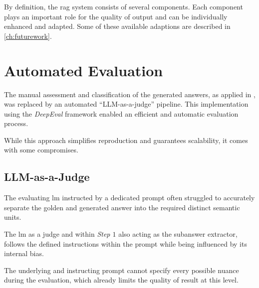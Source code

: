 By definition, the \ac{rag} system consists of several components.
Each component plays an important role for the quality of output and can be individually enhanced and adapted.
Some of these available adaptions are described in \cref{ch:futurework}.
%
\section{Automated Evaluation}

The manual assessment and classification of the generated answers, as applied in \citet{Paul_Keller}, was replaced by an automated \enquote{LLM-as-a-judge} pipeline.
This implementation using the \textit{DeepEval} framework enabled an efficient and automatic evaluation process.

While this approach simplifies reproduction and guarantees scalability, it comes with some compromises.
%
\subsection{LLM-as-a-Judge}

The evaluating \ac{lm} instructed by a dedicated prompt often struggled to accurately separate the golden and generated answer into the required distinct semantic units.

The \ac{lm} as a judge and within \textit{Step $1$} also acting as the subanswer extractor, follows the defined instructions within the prompt while being influenced by its internal bias.

The underlying and instructing prompt cannot specify every possible nuance during the evaluation, which already limits the quality of result at this level.


